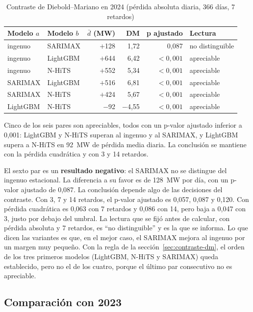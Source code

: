 \begin{table}[H]
	\centering
	\caption{Contraste de Diebold--Mariano en 2024 (pérdida absoluta diaria, 366 días, 7 retardos)}
	\label{tab:final-dm}
	\small
	\begin{tabular}{llrrrl}
		\hline
		\textbf{Modelo $a$} & \textbf{Modelo $b$} & \textbf{$\bar d$ (MW)} & \textbf{DM} & \textbf{p ajustado} & \textbf{Lectura} \\
		\hline
		ingenuo & SARIMAX & $+$128 & 1,72 & 0,087 & no distinguible \\
		ingenuo & LightGBM & $+$644 & 6,42 & $<0{,}001$ & apreciable \\
		ingenuo & N-HiTS & $+$552 & 5,34 & $<0{,}001$ & apreciable \\
		SARIMAX & LightGBM & $+$516 & 6,81 & $<0{,}001$ & apreciable \\
		SARIMAX & N-HiTS & $+$424 & 5,67 & $<0{,}001$ & apreciable \\
		LightGBM & N-HiTS & $-$92 & $-$4,55 & $<0{,}001$ & apreciable \\
		\hline
	\end{tabular}
\end{table}


Cinco de los seis pares son apreciables, todos con un p-valor ajustado
inferior a 0,001: LightGBM y N-HiTS superan al ingenuo y al SARIMAX, y LightGBM
supera a N-HiTS en 92~MW de pérdida media diaria. La conclusión se mantiene con
la pérdida cuadrática y con 3 y 14 retardos.

El sexto par es un \textbf{resultado negativo}: el SARIMAX no se distingue del
ingenuo estacional. La diferencia a su favor es de 128~MW por día, con un
p-valor ajustado de 0,087. La conclusión depende algo de las decisiones del
contraste. Con 3, 7 y 14 retardos, el p-valor ajustado es 0,057, 0,087 y
0,120. Con pérdida cuadrática es 0,063 con 7 retardos y 0,086 con 14, pero
baja a 0,047 con 3, justo por debajo del umbral. La lectura que se fijó antes
de calcular, con pérdida absoluta y 7 retardos, es \enquote{no distinguible} y
es la que se informa. Lo que dicen las variantes es que, en el mejor caso, el
SARIMAX mejora al ingenuo por un margen muy pequeño. Con la regla de la
sección~\ref{sec:contraste-dm}, el orden de los tres primeros modelos
(LightGBM, N-HiTS y SARIMAX) queda establecido, pero no el de los cuatro,
porque el último par consecutivo no es apreciable.

\subsection{Comparación con 2023}\label{sec:final-2023}

